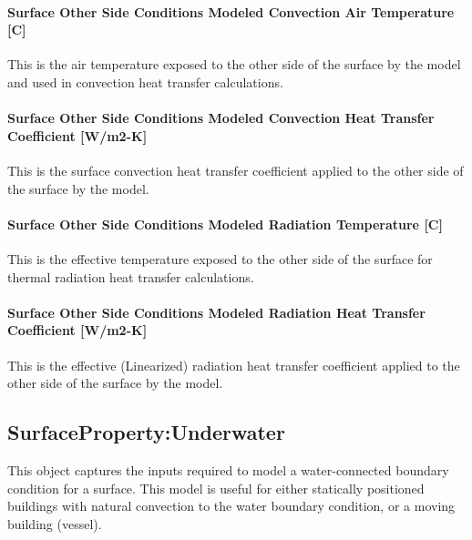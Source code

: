 \paragraph{Surface Other Side Conditions Modeled Convection Air Temperature {[}C{]}}\label{surface-other-side-conditions-modeled-convection-air-temperature-c}

This is the air temperature exposed to the other side of the surface by the model and used in convection heat transfer calculations.

\paragraph{Surface Other Side Conditions Modeled Convection Heat Transfer Coefficient {[}W/m2-K{]}}\label{surface-other-side-conditions-modeled-convection-heat-transfer-coefficient-wm2-k}

This is the surface convection heat transfer coefficient applied to the other side of the surface by the model.

\paragraph{Surface Other Side Conditions Modeled Radiation Temperature {[}C{]}}\label{surface-other-side-conditions-modeled-radiation-temperature-c}

This is the effective temperature exposed to the other side of the surface for thermal radiation heat transfer calculations.

\paragraph{Surface Other Side Conditions Modeled Radiation Heat Transfer Coefficient {[}W/m2-K{]}}\label{surface-other-side-conditions-modeled-radiation-heat-transfer-coefficient-wm2-k}

This is the effective (Linearized) radiation heat transfer coefficient applied to the other side of the surface by the model.

\subsection{SurfaceProperty:Underwater}\label{surfacepropertyunderwater}

This object captures the inputs required to model a water-connected boundary condition for a surface.
This model is useful for either statically positioned buildings with natural convection to the water boundary condition, or a moving building (vessel).

